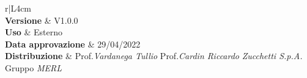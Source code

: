 \begin{center}
	\begin{tabular}{r|L{4cm}}
			 \\
			\hline
			\textbf{Versione}			& V1.0.0 \\
			\textbf{Uso}		& Esterno \\
			\textbf{Data approvazione} 			& 29/04/2022 \\
			\textbf{Distribuzione} 	&	Prof.\textit{Vardanega Tullio} \newline Prof.\textit{Cardin Riccardo} \newline \textit{Zucchetti S.p.A.} \newline Gruppo \textit{MERL} \\
	\end{tabular}
\end{center}
